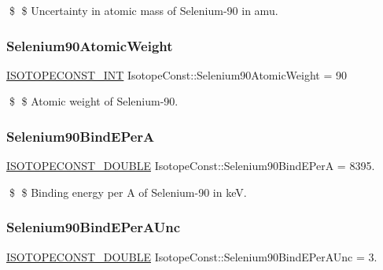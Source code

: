 \$ \$ Uncertainty in atomic mass of Selenium-\/90 in amu. \mbox{\label{group___isotope_const-_selenium-_se90_gaa8106f0454007bcd2de28090fb047079}} 
\subsubsection{\texorpdfstring{Selenium90\+Atomic\+Weight}{Selenium90AtomicWeight}}
{\footnotesize\ttfamily \mbox{\hyperlink{group___isotope_const-_macros_ga5f18360b3e99483a35c32d789e62621c}{I\+S\+O\+T\+O\+P\+E\+C\+O\+N\+S\+T\+\_\+\+I\+NT}} Isotope\+Const\+::\+Selenium90\+Atomic\+Weight = 90}

\$ \$ Atomic weight of Selenium-\/90. \mbox{\label{group___isotope_const-_selenium-_se90_ga5c5cad826eaf63178ec66160898be4ca}} 
\subsubsection{\texorpdfstring{Selenium90\+Bind\+E\+PerA}{Selenium90BindEPerA}}
{\footnotesize\ttfamily \mbox{\hyperlink{group___isotope_const-_macros_ga8f45a7272ce02c0b4c65c44636ed719a}{I\+S\+O\+T\+O\+P\+E\+C\+O\+N\+S\+T\+\_\+\+D\+O\+U\+B\+LE}} Isotope\+Const\+::\+Selenium90\+Bind\+E\+PerA = 8395.}

\$ \$ Binding energy per A of Selenium-\/90 in keV. \mbox{\label{group___isotope_const-_selenium-_se90_ga0b0c306a3a389639f52047cb65a49af0}} 
\subsubsection{\texorpdfstring{Selenium90\+Bind\+E\+Per\+A\+Unc}{Selenium90BindEPerAUnc}}
{\footnotesize\ttfamily \mbox{\hyperlink{group___isotope_const-_macros_ga8f45a7272ce02c0b4c65c44636ed719a}{I\+S\+O\+T\+O\+P\+E\+C\+O\+N\+S\+T\+\_\+\+D\+O\+U\+B\+LE}} Isotope\+Const\+::\+Selenium90\+Bind\+E\+Per\+A\+Unc = 3.}

